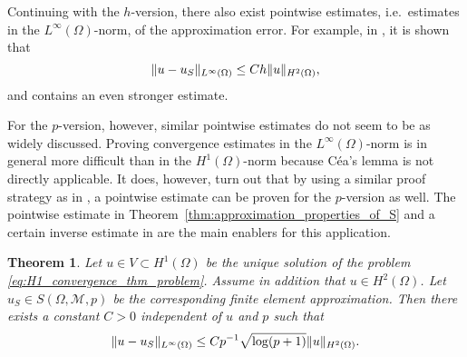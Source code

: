 \documentclass[english, 12pt, a4paper, sci, utf8, a-2b, online]{aaltothesis}
\theoremstyle{definition}
\theoremstyle{plain}
\newtheorem{theorem}{Theorem}[section]
\DeclarePairedDelimiter\norm{\lVert}{\rVert}
\numberwithin{equation}{section}
\begin{document}
Continuing with the $h$-version, there also exist pointwise estimates,
i.e.\ estimates in the $L^{\infty}(\Omega)$-norm, of the approximation error.
For example, in \cite{braess2007}, it is shown that
\begin{equation*}
    \norm{u - u_S}_{L^{\infty}(\Omega)} \leq C h \norm{u}_{H^2(\Omega)},
\end{equation*}
and \cite{ciarlet2002} contains an even stronger estimate.

For the $p$-version, however, similar pointwise estimates do not seem to be
as widely discussed. Proving convergence estimates in the $L^{\infty}(\Omega)$-norm
is in general more difficult than in the $H^1(\Omega)$-norm
because Céa's lemma is not directly applicable.
It does, however, turn out that
by using a similar proof strategy as in \cite[p.\ 93]{braess2007},
a pointwise estimate can be proven for the $p$-version as well.
The pointwise estimate in Theorem~\ref{thm:approximation_properties_of_S}
and a certain inverse estimate in \cite{schwab1998} are the main enablers
for this application.
\begin{theorem}
    \label{thm:pointwise_convergence_of_p_version}
    Let $u \in V \subset H^1(\Omega)$ be the unique solution of the problem 
    \eqref{eq:H1_convergence_thm_problem}.
    Assume in addition that $u \in H^2(\Omega)$.
    Let $u_S \in S(\Omega, \mathcal{M}, p)$ be the corresponding
    finite element approximation. Then there exists a constant $C > 0$
    independent of $u$ and $p$ such that
    \begin{equation*}
        \norm{u-u_S}_{L^{\infty}(\Omega)}
        \leq C p^{-1} \sqrt{\log(p+1)} \norm{u}_{H^2(\Omega)}.
    \end{equation*}
\end{theorem}
\end{document}
